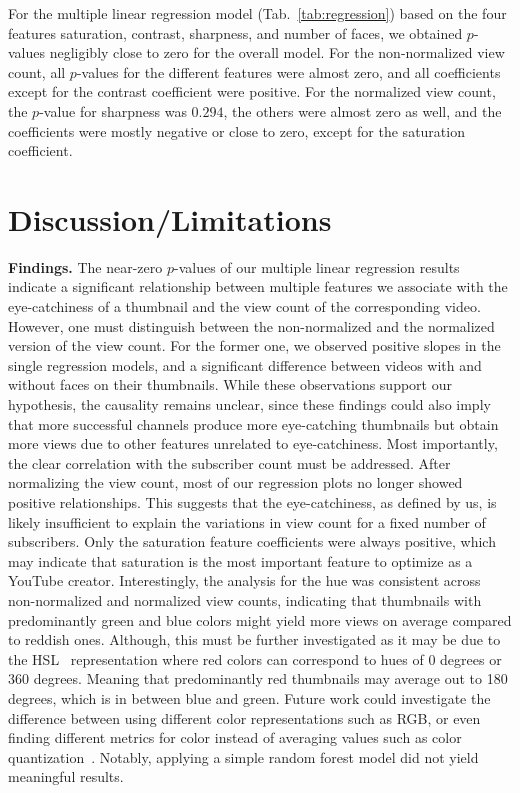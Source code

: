 \documentclass{article}
\begin{document}
For the multiple linear regression model (Tab.~\ref{tab:regression}) based on the four features saturation, contrast, sharpness, and number of faces, we obtained $p$-values negligibly close to zero for the overall model. For the non-normalized view count, all $p$-values for the different features were almost zero, and all coefficients except for the contrast coefficient were positive. For the normalized view count, the $p$-value for sharpness was $0.294$, the others were almost zero as well, and the coefficients were mostly negative or close to zero, except for the saturation coefficient.

\section{Discussion/Limitations}
\textbf{Findings.} The near-zero $p$-values of our multiple linear regression results indicate a significant relationship between multiple features we associate with the eye-catchiness of a thumbnail and the view count of the corresponding video. However, one must distinguish between the non-normalized and the normalized version of the view count. For the former one, we observed positive slopes in the single regression models, and a significant difference between videos with and without faces on their thumbnails. While these observations support our hypothesis, the causality remains unclear, since these findings could also imply that more successful channels produce more eye-catching thumbnails but obtain more views due to other features unrelated to eye-catchiness. Most importantly, the clear correlation with the subscriber count must be addressed. After normalizing the view count, most of our regression plots no longer showed positive relationships. This suggests that the eye-catchiness, as defined by us, is likely insufficient to explain the variations in view count for a fixed number of subscribers. Only the saturation feature coefficients were always positive, which may indicate that saturation is the most important feature to optimize as a YouTube creator. Interestingly, the analysis for the hue was consistent across non-normalized and normalized view counts, indicating that thumbnails with predominantly green and blue colors might yield more views on average compared to reddish ones. Although, this must be further investigated as it may be due to the HSL~\cite{HSL} representation where red colors can correspond to hues of 0 degrees or 360 degrees. Meaning that predominantly red thumbnails may average out to 180 degrees, which is in between blue and green. Future work could investigate the difference between using different color representations such as RGB, or even finding different metrics for color instead of averaging values such as color quantization~\cite{colorquanitzation}. Notably, applying a simple random forest model did not yield meaningful results.
\end{document}
